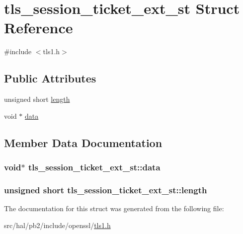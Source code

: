 \hypertarget{structtls__session__ticket__ext__st}{}\section{tls\+\_\+session\+\_\+ticket\+\_\+ext\+\_\+st Struct Reference}
\label{structtls__session__ticket__ext__st}


{\ttfamily \#include $<$tls1.\+h$>$}

\subsection*{Public Attributes}
\begin{DoxyCompactItemize}
\item 
unsigned short \hyperlink{structtls__session__ticket__ext__st_ab4a3be707090c71d78abec6456b8a3a9}{length}
\item 
void $\ast$ \hyperlink{structtls__session__ticket__ext__st_a06405cfdcffe766026c389d9499602a9}{data}
\end{DoxyCompactItemize}


\subsection{Member Data Documentation}
\subsubsection[{\texorpdfstring{data}{data}}]{\setlength{\rightskip}{0pt plus 5cm}void$\ast$ tls\+\_\+session\+\_\+ticket\+\_\+ext\+\_\+st\+::data}\hypertarget{structtls__session__ticket__ext__st_a06405cfdcffe766026c389d9499602a9}{}\label{structtls__session__ticket__ext__st_a06405cfdcffe766026c389d9499602a9}
\subsubsection[{\texorpdfstring{length}{length}}]{\setlength{\rightskip}{0pt plus 5cm}unsigned short tls\+\_\+session\+\_\+ticket\+\_\+ext\+\_\+st\+::length}\hypertarget{structtls__session__ticket__ext__st_ab4a3be707090c71d78abec6456b8a3a9}{}\label{structtls__session__ticket__ext__st_ab4a3be707090c71d78abec6456b8a3a9}


The documentation for this struct was generated from the following file\+:\begin{DoxyCompactItemize}
\item 
src/hal/pb2/include/openssl/\hyperlink{tls1_8h}{tls1.\+h}\end{DoxyCompactItemize}

